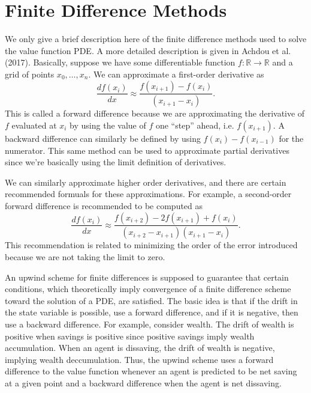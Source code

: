 \documentclass[12 pt, oneside]{article}
\theoremstyle{definition}
\theoremstyle{definition}
\theoremstyle{definition}
\newcommand{\R}{\mathbb{R}}
\newcommand{\ra}{\rightarrow}
\begin{document}
\section{Finite Difference Methods}
We only give a brief description here of the finite difference methods used to solve the value function PDE. A more detailed description is given in Achdou et al. (2017). Basically, suppose we have some differentiable function $f:\R\ra\R$ and a grid of points $x_0,\dots, x_n$. We can approximate a first-order derivative as
\begin{equation}
\label{eq:ex first order finite difference}
  \dfrac{d f(x_i)}{d x} \approx \dfrac{f(x_{i+1}) - f(x_i)}{(x_{i+1} - x_i)}.
\end{equation}
This is called a forward difference because we are approximating the derivative of $f$ evaluated at $x_i$ by using the value of $f$ one ``step'' ahead, i.e. $f(x_{i+1})$. A backward difference can similarly be defined by using $f(x_i) - f(x_{i-1})$ for the numerator. This same method can be used to approximate partial derivatives since we're basically using the limit definition of derivatives.

We can similarly approximate higher order derivatives, and there are certain recommended formuals for these approximations. For example, a second-order forward difference is recommended to be computed as
\begin{equation}
\label{eq:ex second order finite difference}
  \dfrac{d f(x_i)}{d x} \approx \dfrac{f(x_{i+2}) - 2f(x_{i+1}) + f(x_i)}{(x_{i+2} - x_{i+1})(x_{i+1} - x_i)}.
\end{equation}
This recommendation is related to minimizing the order of the error introduced because we are not taking the limit to zero.

An upwind scheme for finite differences is supposed to guarantee that certain conditions, which theoretically imply convergence of a finite difference scheme toward the solution of a PDE, are satisfied. The basic idea is that if the drift in the state variable is possible, use a forward difference, and if it is negative, then use a backward difference. For example, consider wealth. The drift of wealth is positive when savings is positive since positive savings imply wealth accumulation. When an agent is dissaving, the drift of wealth is negative, implying wealth deccumulation. Thus, the upwind scheme uses a forward difference to the value function whenever an agent is predicted to be net saving at a given point and a backward difference when the agent is net dissaving.
\end{document}
